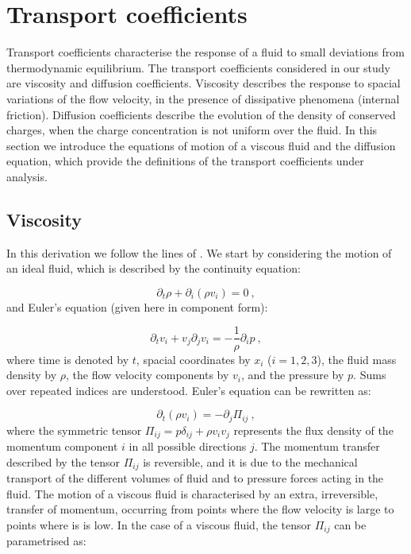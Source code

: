 
\section{Transport coefficients}

Transport coefficients characterise the response of a fluid to small deviations from thermodynamic equilibrium. The transport coefficients considered in our study are viscosity and diffusion coefficients. Viscosity describes the response to spacial variations of the flow velocity, in the presence of dissipative phenomena (internal friction). Diffusion coefficients describe the evolution of the density of conserved charges, when the charge concentration is not uniform over the fluid. In this section we introduce the equations of motion of a viscous fluid and the diffusion equation, which provide the definitions of the transport coefficients under analysis.

\subsection{Viscosity}

In this derivation we follow the lines of \cite{landau2013fluid}. We start by considering the motion of an ideal fluid, which is described by the continuity equation:

\begin{equation}
\partial_t \rho + \partial_i (\rho v_i) = 0 \: ,
\end{equation}
%
and Euler's equation (given here in component form):

\begin{equation}
\partial_t v_i +  v_j \partial_j v_i = -\frac{1}{\rho} \partial_i p \: ,
\end{equation}
%
where time is denoted by $t$, spacial coordinates by $x_i$ ($i=1,2,3$), the fluid mass density by $\rho$, the flow velocity components by $v_i$,  and the pressure by $p$. Sums over repeated indices are understood. Euler's equation can be rewritten as:

\begin{equation}
\partial_t (\rho v_i) = - \partial_j \Pi_{ij} \: ,
\label{Euler}
\end{equation}
%
where the symmetric tensor $\Pi_{ij} = p \delta_{ij} + \rho v_i v_j$ represents the flux density of the momentum component $i$ in all possible directions $j$. The momentum transfer described by the tensor $\Pi_{ij}$ is reversible, and it is due to the mechanical transport of the different volumes of fluid and to pressure forces acting in the fluid. The motion of a viscous fluid is characterised by an extra, irreversible, transfer of momentum, occurring from points where the flow velocity is large to points where is is low.
In the case of a viscous fluid, the tensor $\Pi_{ij}$ can be parametrised as:

